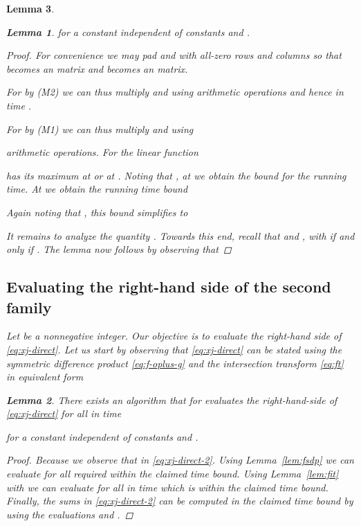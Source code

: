 \documentclass{amsart}
\newtheorem{Lem}{Lemma}
\begin{document}
\begin{Lem}
\begin{Lem}
for a constant  independent of constants  and . 
\end{Lem}
\begin{proof}
For convenience we may pad  and  with all-zero rows and columns 
so that  becomes an  matrix
and  becomes an  matrix.

For  by (M2) we can thus multiply  and  using
 arithmetic 
operations and hence in time . 

For  by (M1) we can thus multiply  and  using 

arithmetic operations.
For  the linear function 

has its maximum at  or at . 
Noting that , at  we
obtain the bound  for the running time.
At  we obtain the running time bound 
 
Again noting that , this bound simplifies to 
 
It remains to analyze the quantity . 
Towards this end, recall that  and 
, with  if and only 
if . The lemma now follows by observing that 

\end{proof}



\subsection{Evaluating the right-hand side of the second family}

Let  be a nonnegative integer. Our objective is to evaluate 
the right-hand side of \eqref{eq:xj-direct}. Let us start
by observing that \eqref{eq:xj-direct} can be stated using
the symmetric difference product \eqref{eq:f-oplus-g} 
and the intersection transform \eqref{eq:ft} in equivalent
form


\begin{Lem}
\label{lem:xj-direct}
There exists an algorithm that for 
evaluates the right-hand-side of \eqref{eq:xj-direct}
for all  in time 
 
for a constant  independent of constants  and . 
\end{Lem}
\begin{proof}
Because  we observe that
 in \eqref{eq:xj-direct-2}. 
Using Lemma~\ref{lem:fsdp} we can evaluate  for
all required  within the claimed time bound. 
Using Lemma~\ref{lem:fit} with 
 we can evaluate  for all 
 in  time which is within the claimed time bound. Finally,
the sums in \eqref{eq:xj-direct-2} can be computed
in the claimed time bound by using the evaluations 
and .
\end{proof}



\end{Lem}
\end{document}
